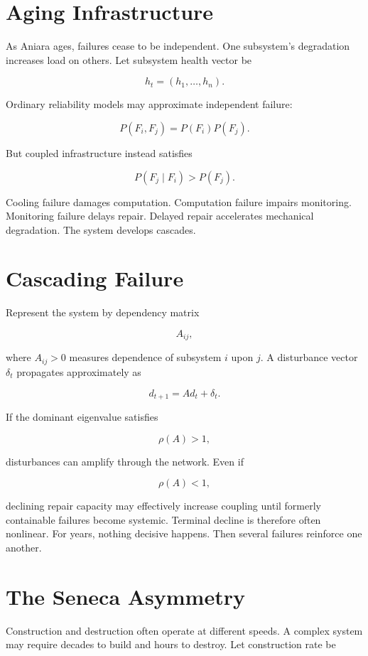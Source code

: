 \documentclass[11pt,oneside]{book}
\theoremstyle{definition}
\theoremstyle{remark}
\begin{document}
\section{Aging Infrastructure}

As Aniara ages, failures cease to be independent. One subsystem's degradation increases load on
others. Let subsystem health vector be

\[
h_t=(h_1,\ldots,h_n).
\]

Ordinary reliability models may approximate independent failure:

\[
P(F_i,F_j) = P(F_i)P(F_j).
\]

But coupled infrastructure instead satisfies

\[
P(F_j\mid F_i) > P(F_j).
\]

Cooling failure damages computation. Computation failure impairs monitoring. Monitoring failure
delays repair. Delayed repair accelerates mechanical degradation. The system develops cascades.

\section{Cascading Failure}

Represent the system by dependency matrix

\[
A_{ij},
\]

where \(A_{ij}>0\) measures dependence of subsystem \(i\) upon \(j\). A disturbance vector
\(\delta_t\) propagates approximately as

\[
d_{t+1} = A d_t+\delta_t.
\]

If the dominant eigenvalue satisfies

\[
\rho(A)>1,
\]

disturbances can amplify through the network. Even if

\[
\rho(A)<1,
\]

declining repair capacity may effectively increase coupling until formerly containable failures
become systemic. Terminal decline is therefore often nonlinear. For years, nothing decisive happens.
Then several failures reinforce one another.

\section{The Seneca Asymmetry}

Construction and destruction often operate at different speeds. A complex system may require decades
to build and hours to destroy. Let construction rate be
\end{document}
